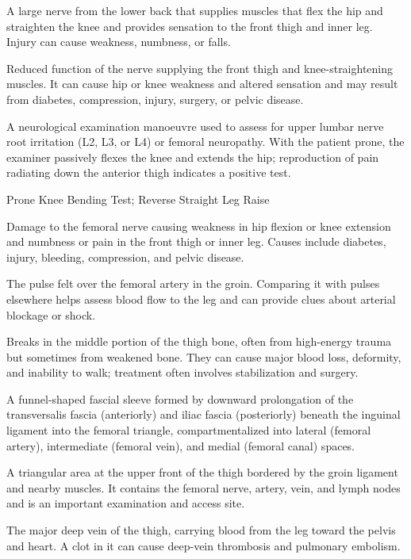  A large nerve from the lower back that supplies muscles that flex the hip and straighten the knee and provides sensation to the front thigh and inner leg. Injury can cause weakness, numbness, or falls.

 Reduced function of the nerve supplying the front thigh and knee-straightening muscles. It can cause hip or knee weakness and altered sensation and may result from diabetes, compression, injury, surgery, or pelvic disease.

 A neurological examination manoeuvre used to assess for upper lumbar nerve root irritation (L2, L3, or L4) or femoral neuropathy. With the patient prone, the examiner passively flexes the knee and extends the hip; reproduction of pain radiating down the anterior thigh indicates a positive test.

\synonyms
Prone Knee Bending Test; Reverse Straight Leg Raise

 Damage to the femoral nerve causing weakness in hip flexion or knee extension and numbness or pain in the front thigh or inner leg. Causes include diabetes, injury, bleeding, compression, and pelvic disease.

 The pulse felt over the femoral artery in the groin. Comparing it with pulses elsewhere helps assess blood flow to the leg and can provide clues about arterial blockage or shock.

 Breaks in the middle portion of the thigh bone, often from high-energy trauma but sometimes from weakened bone. They can cause major blood loss, deformity, and inability to walk; treatment often involves stabilization and surgery.

 A funnel-shaped fascial sleeve formed by downward prolongation of the transversalis fascia (anteriorly) and iliac fascia (posteriorly) beneath the inguinal ligament into the femoral triangle, compartmentalized into lateral (femoral artery), intermediate (femoral vein), and medial (femoral canal) spaces.

 A triangular area at the upper front of the thigh bordered by the groin ligament and nearby muscles. It contains the femoral nerve, artery, vein, and lymph nodes and is an important examination and access site.

 The major deep vein of the thigh, carrying blood from the leg toward the pelvis and heart. A clot in it can cause deep-vein thrombosis and pulmonary embolism.

